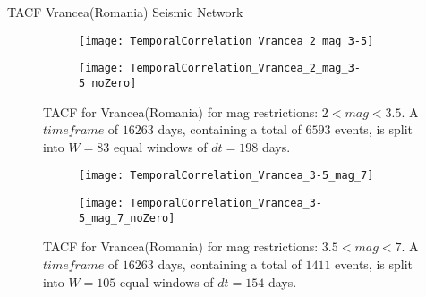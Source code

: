 \begin{frame}{TACF Vrancea(Romania) Seismic Network}
\begin{figure}[!ht]
\begin{subfigure}{.5\textwidth}
  \centering
  \texttt{[image: TemporalCorrelation\_Vrancea\_2\_mag\_3-5]}
  \label{fig:corrVrancea2_3.5}
\end{subfigure}%
\begin{subfigure}{.5\textwidth}
  \centering
  \texttt{[image: TemporalCorrelation\_Vrancea\_2\_mag\_3-5\_noZero]}
  \label{fig:corrVrancea2_3.5_noZero}
\end{subfigure}
\caption{TACF for Vrancea(Romania) for mag restrictions: $2<mag<3.5$. A $timeframe$ of $16263$ days, containing a total of $6593$ events, is split into $W=83$ equal windows of $dt=198$ days.}
\label{fig:corrVrancea2_3.5!}
\end{figure}

\begin{figure}[!ht]
\begin{subfigure}{.5\textwidth}
  \centering
  \texttt{[image: TemporalCorrelation\_Vrancea\_3-5\_mag\_7]}
  \label{fig:corrVrancea3.5_7}
\end{subfigure}%
\begin{subfigure}{.5\textwidth}
  \centering
  \texttt{[image: TemporalCorrelation\_Vrancea\_3-5\_mag\_7\_noZero]}
  \label{fig:corrVrancea3.5_7_noZero}
\end{subfigure}
\caption{TACF for Vrancea(Romania) for mag restrictions: $3.5<mag<7$. A $timeframe$ of $16263$ days, containing a total of $1411$ events, is split into $W=105$ equal windows of $dt=154$ days.}
\label{fig:corrVrancea3.5_7!}
\end{figure}
\end{frame}


